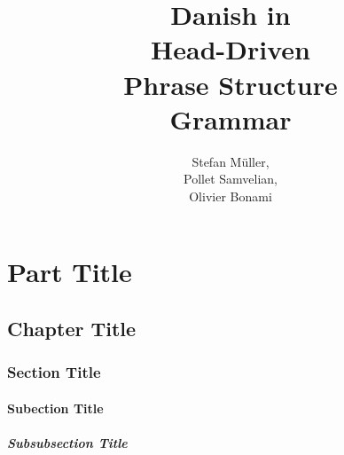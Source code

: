 \documentclass[number=45]{langsci}
\title{Danish in \\ Head-Driven \\   Phrase Structure \\ Grammar  }
\author{Stefan Müller, \\ Pollet Samvelian, \\ Olivier Bonami}
\begin{document}
              
  

    
\maketitle                

\tableofcontents
  
\part{Part Title}	               
\chapter{Chapter Title}
\section{Section Title}
\subsection{Subection Title}
\subsubsection{Subsubsection Title}        

\lipsum 
\lipsum[3-10]  

\newpage

\layout
                              
\end{document}
